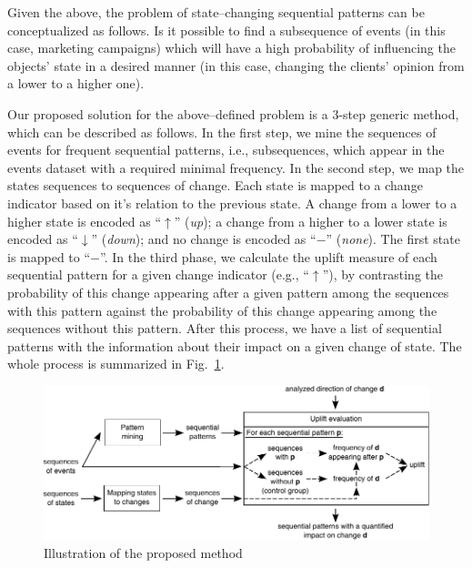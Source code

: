 \documentclass[runningheads,a4paper]{llncs}
\begin{document}
Given the above, the problem of state--changing sequential patterns can be conceptualized as follows.
Is it possible to find a subsequence of events (in this case, marketing campaigns) which will have a high probability of influencing the objects' state in a desired manner (in this case, changing the clients' opinion from a lower to a higher one).

Our proposed solution for the above--defined problem is a 3-step generic method, which can be described as follows.
In the first step, we mine the sequences of events for frequent sequential patterns, i.e., subsequences, which appear in the events dataset with a required minimal frequency.
In the second step, we map the states sequences to sequences of change.
Each state is mapped to a change indicator based on it's relation to the previous state.
A change from a lower to a higher state is encoded as ``$\uparrow$'' (\textit{up}); a change from a higher to a lower state is encoded as ``$\downarrow$'' (\textit{down}); and no change is encoded as ``$-$'' (\textit{none}).
The first state is mapped to ``$-$''.
In the third phase, we calculate the uplift measure of each sequential pattern for a given change indicator (e.g., ``$\uparrow$''), by contrasting the probability of this change appearing after a given pattern among the sequences with this pattern against the probability of this change appearing among the sequences without this pattern.
After this process, we have a list of sequential patterns with the information about their impact on a given change of state.
The whole process is summarized in Fig.~\ref{fig:concept}.

\begin{figure}[!ht]
	\centering
		\includegraphics[width=\textwidth]{images/concept}
	\caption{Illustration of the proposed method}
	\label{fig:concept}
\end{figure}
\end{document}
